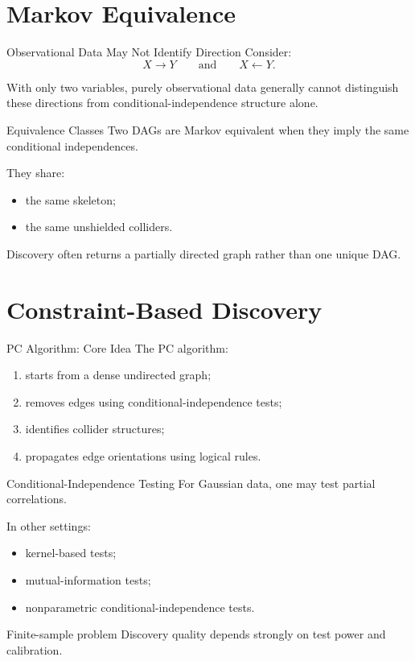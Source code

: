 \documentclass[aspectratio=169,11pt]{beamer}
\begin{document}
\section{Markov Equivalence}

\begin{frame}{Observational Data May Not Identify Direction}
Consider:
\[
X \rightarrow Y
\qquad\text{and}\qquad
X \leftarrow Y.
\]

With only two variables, purely observational data generally cannot distinguish these directions from conditional-independence structure alone.
\end{frame}

\begin{frame}{Equivalence Classes}
Two DAGs are Markov equivalent when they imply the same conditional independences.

They share:
\begin{itemize}
\item the same skeleton;
\item the same unshielded colliders.
\end{itemize}

Discovery often returns a partially directed graph rather than one unique DAG.
\end{frame}

\section{Constraint-Based Discovery}

\begin{frame}{PC Algorithm: Core Idea}
The PC algorithm:
\begin{enumerate}
\item starts from a dense undirected graph;
\item removes edges using conditional-independence tests;
\item identifies collider structures;
\item propagates edge orientations using logical rules.
\end{enumerate}
\end{frame}

\begin{frame}{Conditional-Independence Testing}
For Gaussian data, one may test partial correlations.

In other settings:
\begin{itemize}
\item kernel-based tests;
\item mutual-information tests;
\item nonparametric conditional-independence tests.
\end{itemize}

\begin{alertblock}{Finite-sample problem}
Discovery quality depends strongly on test power and calibration.
\end{alertblock}
\end{frame}
\end{document}

